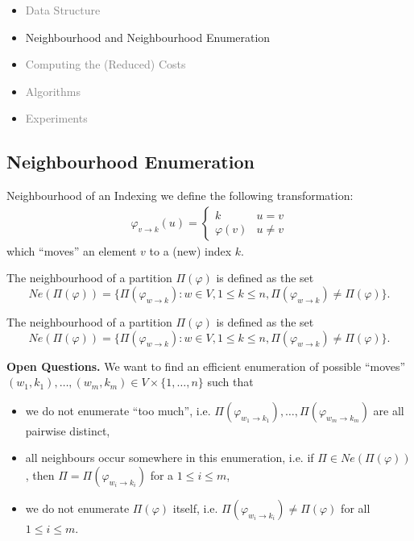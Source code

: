 \documentclass[10pt]{beamer}
\newcommand{\idx}{\varphi}
\newcommand{\move}[3]{#1_{#2\rightarrow #3}}
\begin{document}
\begin{frame}
    \begin{itemize}
        \item \textcolor{gray}{Data Structure}
        \item Neighbourhood and Neighbourhood Enumeration
        \item \textcolor{gray}{Computing the (Reduced) Costs}
        \item \textcolor{gray}{Algorithms}
        \item \textcolor{gray}{Experiments}
    \end{itemize}
\end{frame}

\subsection*{Neighbourhood Enumeration}
\begin{frame}{Neighbourhood of an Indexing}
    we define the following transformation:
    \begin{align*}
        \move{\idx}{v}{k}(u) = \begin{cases}
            k & u = v \\
            \idx(v) & u \neq v
        \end{cases}
    \end{align*}
    which ``moves'' an element $v$ to a (new) index $k$. 
    \par \hrulefill \par 
    The neighbourhood of a partition $\Pi(\idx)$ is defined as the set $$Ne(\Pi(\idx)) = \{  \Pi(\move{\idx}{w}{k}) : w \in V, 1 \leq k \leq n, \Pi(\move{\idx}{w}{k}) \neq \Pi(\idx) \}.$$
\end{frame}

\begin{frame}
    The neighbourhood of a partition $\Pi(\idx)$ is defined as the set $$Ne(\Pi(\idx)) = \{  \Pi(\move{\idx}{w}{k}) : w \in V, 1 \leq k \leq n, \Pi(\move{\idx}{w}{k}) \neq \Pi(\idx) \}.$$
    \par \hrulefill \par 
    \textbf{Open Questions.}
    We want to find an efficient enumeration of possible ``moves'' $(w_1,k_1),\dots,(w_m,k_m) \in V \times \{1,\dots,n\}$ such that
    \begin{itemize}
        \item we do not enumerate ``too much'', i.e. $\Pi(\move{\idx}{w_1}{k_1}),\dots,\Pi(\move{\idx}{w_m}{k_m})$ are all pairwise distinct,
        \item all neighbours occur somewhere in this enumeration, i.e. if $\Pi \in Ne(\Pi(\idx))$, then $\Pi = \Pi(\move{\idx}{w_i}{k_i})$ for a $1 \leq i \leq m$, 
        \item we do not enumerate $\Pi(\idx)$ itself, i.e. $\Pi(\move{\idx}{w_i}{k_i}) \neq \Pi(\idx)$ for all $1 \leq i \leq m$.
    \end{itemize} 
\end{frame}
\end{document}
